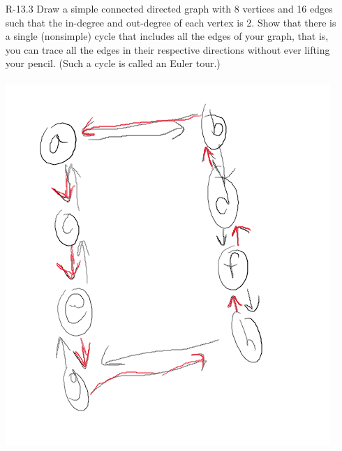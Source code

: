 \begin{itemize}
      \item[R-13.3]  Draw a simple connected directed graph with 8 vertices and 16 edges such
            that the in-degree and out-degree of each vertex is 2. Show that there is
            a single (nonsimple) cycle that includes all the edges of your graph, that
            is, you can trace all the edges in their respective directions without ever
            lifting your pencil. (Such a cycle is called an Euler tour.)\\
            \answer\\
            \includegraphics[scale=0.5]{img/R-13_3.png}


\end{itemize}
